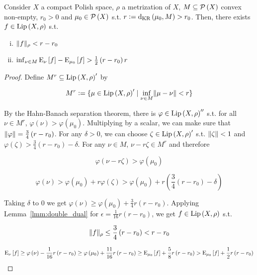 \begin{samepage}
\begin{lemma}
\label{lmm:separation}

Consider $X$ a compact Polish space, $\rho$ a metrization of $X$, $M \subseteq \mathcal{P}\left(X\right)$ convex non-empty, $r_0 > 0$ and $\mu_0 \in \mathcal{P}\left(X\right)$ s.t. $r:=\operatorname{d}_{\textnormal{KR}}\left(\mu_0,M\right) > r_0$. Then, there exists $f \in {\operatorname{Lip}}\left(X,\rho\right)$ s.t.

\begin{enumerate}[i.]

\item $\lVert f \rVert_\rho < r - r_0$
\item $\inf_{\nu \in M} \operatorname{E}_\nu\left[f\right] - \operatorname{E}_{\mu_0}\left[f\right] > \frac{1}{2}\left(r-r_0\right)r$

\end{enumerate}

\end{lemma}
\end{samepage}

\begin{proof}

Define $M^r \subseteq {\operatorname{Lip}}\left(X,\rho\right)'$ by

$$M^r:=\{\mu \in {\operatorname{Lip}}\left(X,\rho\right)' \mid \inf_{\nu \in M} \lVert \mu - \nu \rVert < r\}$$

By the Hahn-Banach separation theorem, there is $\varphi \in {\operatorname{Lip}}\left(X,\rho\right)''$ s.t. for all $\nu \in M^r$, $\varphi\left(\nu\right) > \varphi\left(\mu_0\right)$. Multiplying by a scalar, we can make sure that $\lVert \varphi \rVert = \frac{3}{4}\left(r - r_0\right)$. For any $\delta > 0$, we can choose $\zeta \in {\operatorname{Lip}}\left(X,\rho\right)'$ s.t. $\lVert \zeta \rVert < 1$ and $\varphi\left(\zeta\right) > \frac{3}{4}\left(r-r_0\right) - \delta$.  For any $\nu \in M$, $\nu - r \zeta \in M^r$ and therefore

$$\varphi\left(\nu - r \zeta\right) > \varphi\left(\mu_0\right)$$

$$\varphi\left(\nu\right) > \varphi\left(\mu_0\right) + r \varphi\left(\zeta\right) > \varphi\left(\mu_0\right) + r \left(\frac{3}{4}\left(r-r_0\right) - \delta\right)$$

Taking $\delta$ to 0 we get $\varphi\left(\nu\right) \geq \varphi\left(\mu_0\right) + \frac{3}{4} r \left(r - r_0\right)$. Applying Lemma~\ref{lmm:double_dual} for $\epsilon = \frac{1}{16} r \left(r - r_0\right)$, we get $f \in {\operatorname{Lip}}\left(X,\rho\right)$ s.t.

$$\lVert f \rVert_\rho \leq \frac{3}{4} \left(r - r_0\right) < r - r_0$$ 

$$\operatorname{E}_\nu\left[f\right] \geq \varphi\left(\nu\right) - \frac{1}{16} r \left(r - r_0\right) \geq \varphi\left(\mu_0\right) + \frac{11}{16} r \left(r - r_0\right) \geq \operatorname{E}_{\mu_0}\left[f\right] +  \frac{5}{8} r \left(r - r_0\right) > \operatorname{E}_{\mu_0}\left[f\right] +  \frac{1}{2} r \left(r - r_0\right)$$
\end{proof}

